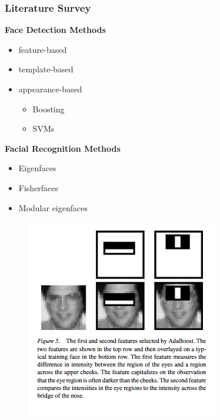 \documentclass{beamer}
\begin{document}
\begin{frame}[t]\frametitle{Literature Survey}

\begin{minipage}[t]{0.45\linewidth}
    \textbf{Face Detection Methods} \cite{yang2002detecting}
    \begin{itemize}
        \item feature-based
        \item template-based
        \item appearance-based
        \begin{itemize}
            \item Boosting \cite{viola2004robust}
            \item SVMs \cite{osuna1997training}
        \end{itemize}
    \end{itemize}

    \textbf{Facial Recognition Methods} \cite{jain2005handbook}

    \begin{itemize}
        \item Eigenfaces \cite{turk1991eigenfaces,turk1991face}
        \item Fisherfaces \cite{belhumeur1997eigenfaces}
        \item Modular eigenfaces \cite{pentland1994view}
    \end{itemize}
    \end{minipage}
    \hfill
    \begin{minipage}[t]{0.45\linewidth}
        \begin{figure}
            \includegraphics[width=\linewidth]{robust.png}
        \end{figure}
    \end{minipage}

\end{frame}
\end{document}
